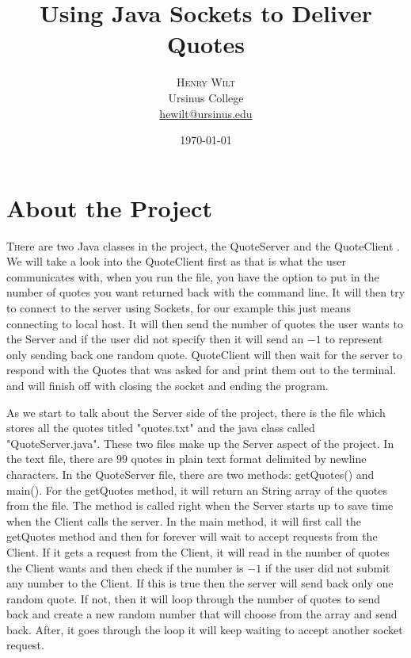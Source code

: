 \documentclass[twoside,twocolumn]{article}
\title{Using Java Sockets to Deliver Quotes} %
\author{%
\textsc{Henry Wilt} \\[1ex]%
\normalsize Ursinus College \\ %
\normalsize \href{mailto:hewilt@ursinus.edu}{hewilt@ursinus.edu} %
}
\date{\today} %
\begin{document}
\maketitle


\section{About the Project}

\lettrine[nindent=0em,lines=2]{T}here are two Java classes in the project, the QuoteServer and the QuoteClient \cite{assignmentgithub}. We will take a look into the QuoteClient first as that is what the user communicates with, when you run the file, you have the option to put in the number of quotes you want returned back with the command line. It will then try to connect to the server using Sockets, for our example this just means connecting to local host. It will then send the number of quotes the user wants to the Server and if the user did not specify then it will send an $-1$ to represent only sending back one random quote. QuoteClient will then wait for the server to respond with the Quotes that was asked for and print them out to the terminal. and will finish off with closing the socket and ending the program. \par As we start to talk about the Server side of the project, there is the file which stores all the quotes titled "quotes.txt" and the java class called "QuoteServer.java". These two files make up the Server aspect of the project. In the text file, there are $99$ quotes in plain text format delimited by newline characters. In the QuoteServer file, there are two methods: getQuotes() and main(). For the getQuotes method, it will return an String array of the quotes from the file. The method is called right when the Server starts up to save time when the Client calls the server. In the main method, it will first call the getQuotes method and then for forever will wait to accept requests from the Client. If it gets a request from the Client, it will read in the number of quotes the Client wants and then check if the number is $-1$ if the user did not submit any number to the Client. If this is true then the server will send back only one random quote. If not, then it will loop through the number of quotes to send back and create a new random number that will choose from the array and send back. After, it goes through the loop it will keep waiting to accept another socket request.
\end{document}
